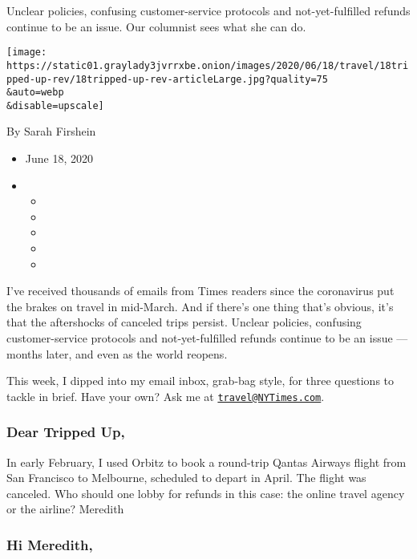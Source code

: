 Unclear policies, confusing customer-service protocols and
not-yet-fulfilled refunds continue to be an issue. Our columnist sees
what she can do.

\texttt{[image: https://static01.graylady3jvrrxbe.onion/images/2020/06/18/travel/18tripped-up-rev/18tripped-up-rev-articleLarge.jpg?quality=75\\\&auto=webp\\\&disable=upscale]}

By Sarah Firshein

\begin{itemize}
\item
  June 18, 2020
\item
  \begin{itemize}
  \item
  \item
  \item
  \item
  \item
  \end{itemize}
\end{itemize}

I've received thousands of emails from Times readers since the
coronavirus put the brakes on travel in mid-March. And if there's one
thing that's obvious, it's that the aftershocks of canceled trips
persist. Unclear policies, confusing customer-service protocols and
not-yet-fulfilled refunds continue to be an issue --- months later, and
even as the world reopens.

This week, I dipped into my email inbox, grab-bag style, for three
questions to tackle in brief. Have your own? Ask me at
\href{mailto:travel@NYTimes.com}{\nolinkurl{travel@NYTimes.com}}.

\hypertarget{dear-tripped-up}{%
\subsubsection{\texorpdfstring{\textbf{Dear Tripped
Up,}}{Dear Tripped Up,}}\label{dear-tripped-up}}

In early February, I used Orbitz to book a round-trip Qantas Airways
flight from San Francisco to Melbourne, scheduled to depart in April.
The flight was canceled. Who should one lobby for refunds in this case:
the online travel agency or the airline? Meredith

\hypertarget{hi-meredith}{%
\subsubsection{Hi Meredith,}\label{hi-meredith}}

